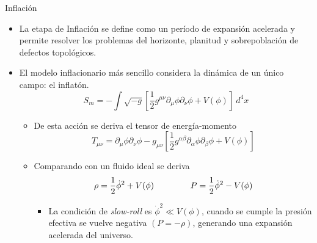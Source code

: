 \documentclass{beamer}
\begin{document}
            \begin{frame}{Inflación}
                \begin{itemize}
                    \item[\textcolor{brown}{$\bullet$}] La etapa de Inflación se define como un período de expansión acelerada y permite resolver los problemas del horizonte, planitud y sobrepoblación de defectos topológicos.
                    \item[\textcolor{brown}{$\bullet$}] El modelo inflacionario más sencillo considera la dinámica de un único campo: el inflatón.
                        \begin{equation*}
                            S_m = - \int \sqrt{-g} \left[ \frac{1}{2} g^{\mu\nu} \partial_\mu \phi \partial_\nu \phi + V(\phi) \right] ~ d^4 x
                        \end{equation*}
                        \begin{itemize}
                            \item[\textcolor{cyan}{$\bullet$}] De esta acción se deriva el tensor de energía-momento
                                \begin{equation*}
                                    T_{\mu\nu} = \partial_\mu \phi \partial_\nu \phi - g_{\mu\nu} \left[ \frac{1}{2} g^{\alpha\beta} \partial_\alpha \phi \partial_\beta \phi + V(\phi) \right]
                                \end{equation*}
                            \item[\textcolor{cyan}{$\bullet$}] Comparando con un fluido ideal se deriva
                                \begin{equation*}
                                    \rho = \frac{1}{2} \dot{\phi}^2 + V(\phi) \hspace{1.5cm} P = \frac{1}{2} \dot{\phi}^2 - V(\phi)
                                \end{equation*}
                            \begin{itemize}
                                \item[\textcolor{red}{$\Longrightarrow$}] La condición de \textit{slow-roll} es $\dot{\phi}^2 \ll V(\phi)$, cuando se cumple la presión efectiva se vuelve negativa $(P = - \rho)$, generando una expansión acelerada del universo.
                            \end{itemize}
                        \end{itemize}  
                \end{itemize}
            \end{frame}
\end{document}
